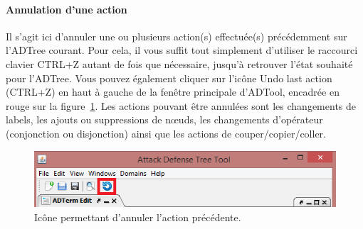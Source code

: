 \paragraph{Annulation d'une action} Il s'agit ici d'annuler une ou plusieurs action(s) effectuée(s) précédemment sur l'ADTree courant. Pour cela, il vous suffit tout simplement d'utiliser le raccourci clavier {\sc CTRL+Z} autant de fois que nécessaire, jusqu'à retrouver l'état souhaité pour l'ADTree. Vous pouvez également cliquer sur l'icône \og Undo last action (CTRL+Z) \fg{} en haut à gauche de la fenêtre principale d'ADTool, encadrée en rouge sur la {\sc figure}~\ref{fig:undo}. Les actions pouvant être annulées sont les changements de labels, les ajouts ou suppressions de n\oe{}uds, les changements d'opérateur (conjonction ou disjonction) ainsi que les actions de couper/copier/coller.

\begin{figure}[!h]
        \centering
        \includegraphics[height=0.17\textwidth]{figure/undo.png}
        \caption{Icône permettant d'annuler l'action précédente.}
        \label{fig:undo}
    \end{figure}